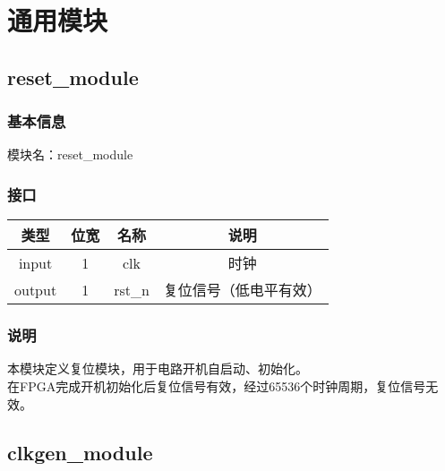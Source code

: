 %
%
%
%
%
%
%
%

\chapter{通用模块}

\section{reset\_module}
\subsection{基本信息}
模块名：reset\_module
\subsection{接口}
\begin{tabular}{|c|c|c|c|}
    \hline
    类型    &   位宽    &   名称    &   说明\\\hline
    input   &   1   &   clk &   时钟\\\hline
    output   &   1   &   rst\_n  &   复位信号（低电平有效）\\\hline
\end{tabular}
\subsection{说明}
本模块定义复位模块，用于电路开机自启动、初始化。\\
在FPGA完成开机初始化后复位信号有效，经过65536个时钟周期，复位信号无效。

\section{clkgen\_module}
